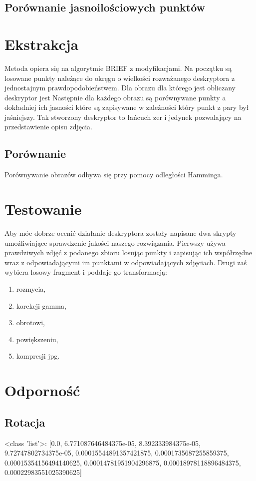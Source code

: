 \documentclass[a4paper,11pt]{article}
\begin{document}
\subsection{Porównanie jasnoilościowych punktów}

\section{Ekstrakcja}
Metoda opiera się na algorytmie BRIEF z modyfikacjami.
Na początku są losowane punkty należące do okręgu o wielkości rozważanego deskryptora z jednostajnym prawdopodobieństwem. Dla obrazu dla którego jest obliczany deskryptor jest  %
Następnie dla każdego obrazu są porównywane punkty a dokładniej ich jasności które są zapisywane w zależności który punkt z pary był jaśniejszy. Tak stworzony deskryptor to łańcuch zer i jedynek pozwalający na przedstawienie opisu zdjęcia. 

\subsection{Porównanie}
Porównywanie obrazów odbywa się przy pomocy odległości Hamminga.

\section{Testowanie}
Aby móc dobrze ocenić działanie deskryptora zostały napisane dwa skrypty umożliwiające sprawdzenie jakości naszego rozwiązania. Pierwszy używa prawdziwych zdjęć z podanego zbioru losując punkty i zapisując ich współrzędne wraz z odpowiadającymi im punktami w odpowiadających zdjęciach. Drugi zaś wybiera losowy fragment i poddaje go transformacją:
\begin{enumerate}
\item rozmycia,
\item korekcji gamma,
\item obrotowi,
\item powiększeniu,
\item kompresji jpg.
\end{enumerate}
\section{Odporność}
\subsection{Rotacja}
<class 'list'>: [0.0, 6.771087646484375e-05, 8.392333984375e-05, 9.72747802734375e-05, 0.00015544891357421875, 0.0001735687255859375, 0.00015354156494140625, 0.00014781951904296875, 0.00018978118896484375, 0.00022983551025390625]
\end{document}
